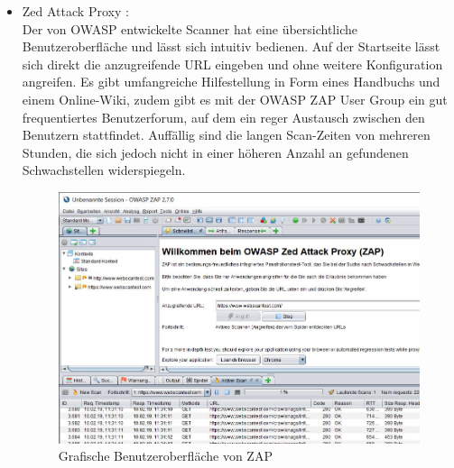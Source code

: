 \documentclass[12pt,oneside,a4paper,parskip]{scrbook}
\begin{document}
\begin{itemize}
          \item Zed Attack Proxy \cite{ZAP}:\\
            Der von OWASP entwickelte Scanner hat eine übersichtliche Benutzeroberfläche und lässt sich intuitiv bedienen. Auf der Startseite lässt sich direkt die anzugreifende URL eingeben und ohne weitere Konfiguration angreifen. Es gibt umfangreiche Hilfestellung in Form eines Handbuchs und einem Online-Wiki, zudem gibt es mit der OWASP ZAP User Group ein gut frequentiertes Benutzerforum, auf dem ein reger Austausch zwischen den Benutzern stattfindet.
            Auffällig sind die langen Scan-Zeiten von mehreren Stunden, die sich jedoch nicht in einer höheren Anzahl an gefundenen Schwachstellen widerspiegeln.
          \begin{figure}[H]
            \includegraphics[width=1\textwidth]{Images/ZAP}
            \caption[Grafische Benutzeroberfläche von ZAP]{Grafische Benutzeroberfläche von ZAP}
          \end{figure}
        \end{itemize}
\end{document}
